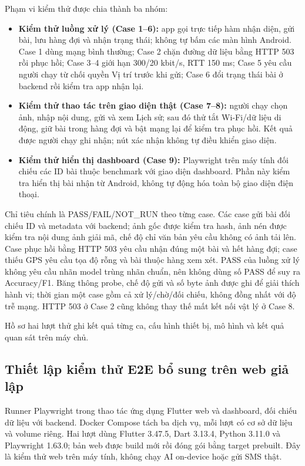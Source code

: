 Phạm vi kiểm thử được chia thành ba nhóm:
\begin{itemize}
\item \textbf{Kiểm thử luồng xử lý (Case 1--6):} app gọi trực tiếp hàm nhận diện, gửi bài, lưu hàng đợi và nhận trạng thái; không tự bấm các màn hình Android. Case 1 dùng mạng bình thường; Case 2 chặn đường dữ liệu bằng HTTP 503 rồi phục hồi; Case 3--4 giới hạn 300/20 kbit/s, RTT 150 ms; Case 5 yêu cầu người chạy từ chối quyền Vị trí trước khi gửi; Case 6 đổi trạng thái bài ở backend rồi kiểm tra app nhận lại.
\item \textbf{Kiểm thử thao tác trên giao diện thật (Case 7--8):} người chạy chọn ảnh, nhập nội dung, gửi và xem Lịch sử; sau đó thử tắt Wi-Fi/dữ liệu di động, giữ bài trong hàng đợi và bật mạng lại để kiểm tra phục hồi. Kết quả được người chạy ghi nhận; nút xác nhận không tự điều khiển giao diện.
\item \textbf{Kiểm thử hiển thị dashboard (Case 9):} Playwright trên máy tính đối chiếu các ID bài thuộc benchmark với giao diện dashboard. Phần này kiểm tra hiển thị bài nhận từ Android, không tự động hóa toàn bộ giao diện điện thoại.
\end{itemize}

Chỉ tiêu chính là PASS/FAIL/NOT\_RUN theo từng case. Các case gửi bài đối chiếu ID và metadata với backend; ảnh gốc được kiểm tra hash, ảnh nén được kiểm tra nội dung ảnh giải mã, chế độ chỉ văn bản yêu cầu không có ảnh tải lên. Case phục hồi bằng HTTP 503 yêu cầu nhận đúng một bài và hết hàng đợi; case thiếu GPS yêu cầu tọa độ rỗng và bài thuộc hàng xem xét. PASS của luồng xử lý không yêu cầu nhãn model trùng nhãn chuẩn, nên không dùng số PASS để suy ra Accuracy/F1. Băng thông probe, chế độ gửi và số byte ảnh được ghi để giải thích hành vi; thời gian một case gồm cả xử lý/chờ/đối chiếu, không đồng nhất với độ trễ mạng. HTTP 503 ở Case 2 cũng không thay thế mất kết nối vật lý ở Case 8.

Hồ sơ hai lượt thử ghi kết quả từng ca, cấu hình thiết bị, mô hình và kết quả quan sát trên máy chủ.

\subsection{Thiết lập kiểm thử E2E bổ sung trên web giả lập}\label{sec:web-e2e-setup}
Runner Playwright trong  thao tác ứng dụng Flutter web và dashboard, đối chiếu dữ liệu với backend. Docker Compose tách ba dịch vụ, mỗi lượt có cơ sở dữ liệu và volume riêng. Hai lượt dùng Flutter 3.47.5, Dart 3.13.4, Python 3.11.0 và Playwright 1.63.0; bản web được build mới rồi đóng gói bằng target prebuilt. Đây là kiểm thử web trên máy tính, không chạy AI on-device hoặc gửi SMS thật.

